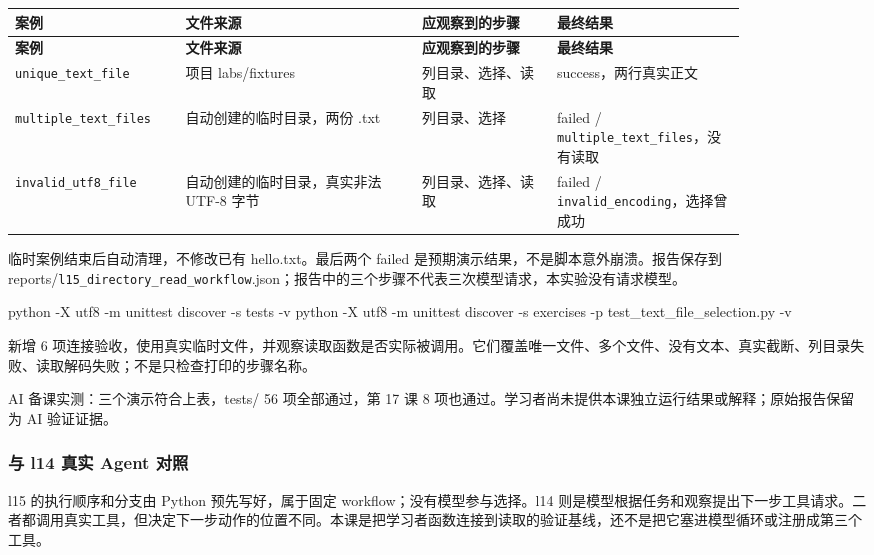 \documentclass[UTF8,zihao=-4,fontset=fandol]{ctexart}
\begin{document}
{\small\setlength{\tabcolsep}{4pt}
\renewcommand{\arraystretch}{1.25}
\begin{longtable}{>{\raggedright\arraybackslash}p{0.18\linewidth}>{\raggedright\arraybackslash}p{0.29\linewidth}>{\raggedright\arraybackslash}p{0.16\linewidth}>{\raggedright\arraybackslash}p{0.22\linewidth}}
\toprule
\textbf{案例} & \textbf{文件来源} & \textbf{应观察到的步骤} & \textbf{最终结果} \\
\midrule\endfirsthead
\toprule
\textbf{案例} & \textbf{文件来源} & \textbf{应观察到的步骤} & \textbf{最终结果} \\
\midrule\endhead
\bottomrule\endfoot
\nolinkurl{unique_text_file} & 项目 labs/fixtures & 列目录、选择、读取 & success，两行真实正文 \\
\nolinkurl{multiple_text_files} & 自动创建的临时目录，两份 .txt & 列目录、选择 & failed / \nolinkurl{multiple_text_files}，没有读取 \\
\nolinkurl{invalid_utf8_file} & 自动创建的临时目录，真实非法 UTF-8 字节 & 列目录、选择、读取 & failed / \nolinkurl{invalid_encoding}，选择曾成功 \\
\end{longtable}}

临时案例结束后自动清理，不修改已有 hello.txt。最后两个 failed 是预期演示结果，不是脚本意外崩溃。报告保存到 reports/\nolinkurl{l15_directory_read_workflow}.json；报告中的三个步骤不代表三次模型请求，本实验没有请求模型。

\begin{Code}
python -X utf8 -m unittest discover -s tests -v
python -X utf8 -m unittest discover -s exercises -p test_text_file_selection.py -v
\end{Code}

新增 6 项连接验收，使用真实临时文件，并观察读取函数是否实际被调用。它们覆盖唯一文件、多个文件、没有文本、真实截断、列目录失败、读取解码失败；不是只检查打印的步骤名称。

AI 备课实测：三个演示符合上表，tests/ 56 项全部通过，第 17 课 8 项也通过。学习者尚未提供本课独立运行结果或解释；原始报告保留为 AI 验证证据。

\subsubsection{与 l14 真实 Agent 对照}

l15 的执行顺序和分支由 Python 预先写好，属于固定 workflow；没有模型参与选择。l14 则是模型根据任务和观察提出下一步工具请求。二者都调用真实工具，但决定下一步动作的位置不同。本课是把学习者函数连接到读取的验证基线，还不是把它塞进模型循环或注册成第三个工具。
\end{document}
